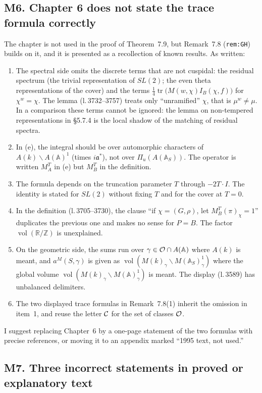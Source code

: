 \documentclass[12pt,letterpaper]{article}
\newcommand{\tr}{\operatorname{tr}}
\newcommand{\A}{\mathbb{A}}
\newcommand{\R}{\mathbb{R}}
\newcommand{\Z}{\mathbb{Z}}
\newcommand{\lref}[1]{\textup{(l.\,#1)}}
\theoremstyle{plain}
\begin{document}
\subsection*{M6. Chapter 6 does not state the trace formula correctly}

The chapter is not used in the proof of Theorem~7.9, but Remark~7.8
(\texttt{rem:GH}) builds on it, and it is presented as a recollection of
known results. As written:
\begin{enumerate}
\item The spectral side omits the discrete terms that are not cuspidal:
the residual spectrum (the trivial representation of $SL(2)$; the even
theta representations of the cover) and the terms
$\tfrac14\tr\bigl(M(w,\chi)I_B(\chi,f)\bigr)$ for $\chi^w=\chi$. The lemma
\lref{3732--3757} treats only ``unramified'' $\chi$, that is
$\mu^w\neq\mu$. In a comparison these terms cannot be ignored: the lemma on
non-tempered representations in \S5.7.4 is the local shadow of the
matching of residual spectra.
\item In (e), the integral should be over automorphic characters of
$A(k)\backslash A(\A)^1$ (times $i\mathfrak{a}^*$), not over
$\Pi_u(A(\A_S))$. The operator is written $M_A^T$ in (e) but $M_B^T$ in
the definition.
\item The formula depends on the truncation parameter $T$ through
$-2T\cdot I$. The identity is stated for $SL(2)$ without fixing $T$ and for
the cover at $T=0$.
\item In the definition \lref{3705--3730}, the clause
``if $\chi=(G,\rho)$, let $M_B^T(\pi)_\chi=1$'' duplicates the previous
one and makes no sense for $P=B$. The factor
$\operatorname{vol}(\R/\Z)$ is unexplained.
\item On the geometric side, the sums run over
$\gamma\in{\cal O}\cap A(\A)$ where $A(k)$ is meant, and
$a^M(S,\gamma)$ is given as
$\operatorname{vol}(M(k)_\gamma\backslash M(\A_S)^1_\gamma)$ where the
global volume $\operatorname{vol}(M(k)_\gamma\backslash M(\A)^1_\gamma)$ is
meant. The display \lref{3589} has unbalanced delimiters.
\item The two displayed trace formulas in Remark~7.8(1) inherit the
omission in item~1, and reuse the letter ${\cal C}$ for the set of classes
${\cal O}$.
\end{enumerate}
I suggest replacing Chapter~6 by a one-page statement of the two formulas
with precise references, or moving it to an appendix marked ``1995 text,
not used.''

\subsection*{M7. Three incorrect statements in proved or explanatory text}
\end{document}
